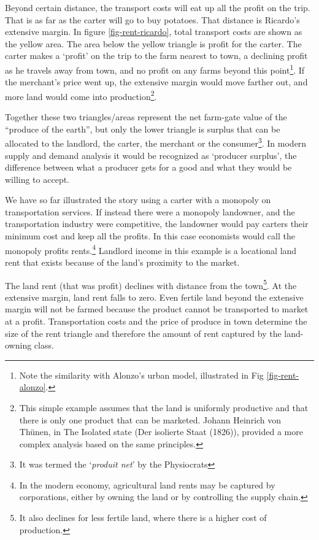 Beyond certain distance, the transport costs will eat up all the profit on the trip. That is as far as the carter will go to buy potatoes. That distance is Ricardo's extensive margin. In figure \ref{fig-rent-ricardo}, total transport costs are shown as the yellow area. The area below the yellow triangle is profit for the carter. The carter makes a `profit' on the trip to the farm nearest to town, a declining profit as he travels away from town, and no profit on any farms beyond this point\footnote{Note the similarity with Alonzo's urban model, illustrated in Fig \ref{fig-rent-alonzo}.}.
If the merchant's price went up, the extensive margin would move farther out, and more land would come into production\footnote{This simple example assumes that the land is uniformly productive and that there is only one product that can be marketed. Johann Heinrich von Th\"unen, in The Isolated state (Der isolierte Staat (1826)\cite{vonthunenIsolirteStaatBeziehung1826}), provided a more complex analysis based on the same principles.}.

Together these two triangles/areas represent the net farm-gate value of the ``produce of the earth'', but only the lower triangle is surplus that can be allocated to the landlord, the carter, the merchant or the consumer\footnote{It was termed the `\textit{produit net}' by the Physiocrats}. In modern supply and demand analysis it would be recognized as `producer surplus', the difference between what a producer gets for a good and what they would be willing to accept.

We have so far illustrated the story using a carter with a monopoly on transportation services. If instead there were a monopoly landowner, and the transportation industry were competitive, the landowner would pay carters their minimum cost and keep all the profits. In this case economists would call the monopoly profits rents.\footnote{In the modern economy, agricultural land rents may be captured by corporations,  either by owning the land or by controlling the supply chain.}  Landlord income in this example is a locational land rent that exists because of the land's proximity to the market.  

The land rent (that was profit) declines with distance from the town\footnote{It also declines for less fertile land, where there is a higher cost of production.}. At the extensive margin, land rent falls to zero. Even fertile land beyond the extensive margin will not be farmed because the product cannot be transported to market at a profit. Transportation costs and the price of produce in town determine the size of the  rent triangle and therefore the amount of rent captured by the land-owning class.%


